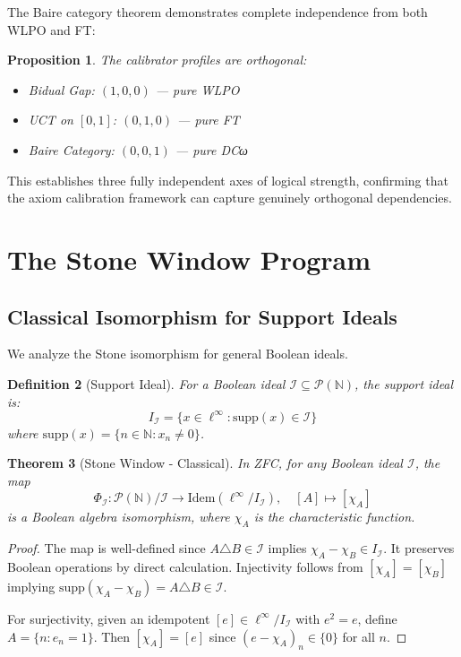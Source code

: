 \documentclass[11pt]{article}
\newtheorem{theorem}{Theorem}[section]
\newtheorem{definition}[theorem]{Definition}
\newtheorem{proposition}[theorem]{Proposition}
\newcommand{\N}{\mathbb{N}}
\newcommand{\linf}{\ell^\infty}
\begin{document}
The Baire category theorem demonstrates complete independence from both WLPO and FT:

\begin{proposition}
The calibrator profiles are orthogonal:
\begin{itemize}
\item Bidual Gap: $(1, 0, 0)$ — pure WLPO
\item UCT on $[0,1]$: $(0, 1, 0)$ — pure FT
\item Baire Category: $(0, 0, 1)$ — pure DCω
\end{itemize}
\end{proposition}

This establishes three fully independent axes of logical strength, confirming that the axiom calibration framework can capture genuinely orthogonal dependencies.

\section{The Stone Window Program}

\subsection{Classical Isomorphism for Support Ideals}

We analyze the Stone isomorphism for general Boolean ideals.

\begin{definition}[Support Ideal]
For a Boolean ideal $\mathcal{I} \subseteq \mathcal{P}(\N)$, the \emph{support ideal} is:
\[
I_{\mathcal{I}} = \{x \in \linf : \text{supp}(x) \in \mathcal{I}\}
\]
where $\text{supp}(x) = \{n \in \N : x_n \neq 0\}$.
\end{definition}

\begin{theorem}[Stone Window - Classical]\label{thm:stone-classical}
In ZFC, for any Boolean ideal $\mathcal{I}$, the map
\[
\Phi_{\mathcal{I}}: \mathcal{P}(\N)/\mathcal{I} \to \text{Idem}(\linf/I_{\mathcal{I}}), \quad [A] \mapsto [\chi_A]
\]
is a Boolean algebra isomorphism, where $\chi_A$ is the characteristic function.
\end{theorem}

\begin{proof}
The map is well-defined since $A \triangle B \in \mathcal{I}$ implies $\chi_A - \chi_B \in I_{\mathcal{I}}$. It preserves Boolean operations by direct calculation. Injectivity follows from $[\chi_A] = [\chi_B]$ implying $\text{supp}(\chi_A - \chi_B) = A \triangle B \in \mathcal{I}$.

For surjectivity, given an idempotent $[e] \in \linf/I_{\mathcal{I}}$ with $e^2 = e$, define $A = \{n : e_n = 1\}$. Then $[\chi_A] = [e]$ since $(e - \chi_A)_n \in \{0\}$ for all $n$.
\end{proof}
\end{document}
